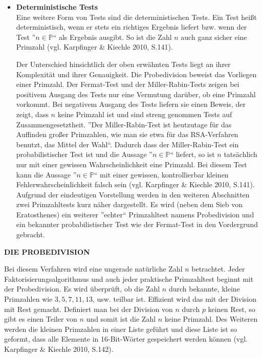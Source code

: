 \begin{itemize}
 \item \textbf{Deterministische Tests}\\
    Eine weitere Form von Tests sind die deterministischen
    Tests. Ein Test heißt deterministisch, wenn er stets ein
    richtiges Ergebnis liefert bzw. wenn der Test
    ''$n \in\mathbb{P}$`` als Ergebnis ausgibt. So ist die
    Zahl $n$ auch ganz sicher eine Primzahl
    (vgl. Karpfinger \& Kiechle 2010, S.141).
    
    Der Unterschied hinsichtlich der oben erwähnten Tests
    liegt an ihrer Komplexität und ihrer Genauigkeit.
    Die Probedivision beweist das Vorliegen einer Primzahl.
    Der Fermat-Test und der Miller-Rabin-Tests zeigen bei
    positivem Ausgang des Tests nur eine Vermutung darüber,
    ob eine Primzahl vorkommt. Bei negativem Ausgang des
    Tests liefern sie einen Beweis, der zeigt, dass $n$
    keine Primzahl ist und sind streng genommen Tests auf
    Zusammengesetztheit. ''Der Miller-Rabin-Test ist
    heutzutage für das Auffinden großer Primzahlen, wie man
    sie etwa für das RSA-Verfahren benutzt, das Mittel der 
    Wahl``. Dadurch dass der Miller-Rabin-Test ein
    probabilistischer Test ist und die Aussage
    ''$n \in\mathbb{P}$`` liefert, so ist $n$ tatsächlich
    nur mit einer gewissen Wahrscheinlichkeit eine Primzahl.
    Bei diesem Test kann die Aussage ''$n \in\mathbb{P}$``
    mit einer gewissen, kontrollierbar kleinen
    Fehlerwahrscheinlichkeit falsch sein
    (vgl. Karpfinger \& Kiechle 2010, S.141).\\
    Aufgrund der eindeutigen Vorstellung werden in den
    weiteren Abschnitten zwei Primzahltests kurz näher
    dargestellt. Es wird (neben dem Sieb von Eratosthenes)
    ein weiterer ''echter`` Primzahltest namens
    Probedivision und ein bekannter probabilistischer Test
    wie der Fermat-Test in den Vordergrund gebracht.\\
\end{itemize}


\textbf{DIE PROBEDIVISION}

Bei diesem Verfahren wird eine ungerade natürliche Zahl
$n$ betrachtet. Jeder Faktorisierungsalgorithmus und auch
jeder praktische Primzahltest beginnt mit der Probedivision.
Es wird überprüft, ob die Zahl $n$ durch bekannte, kleine
Primzahlen wie $3, 5, 7, 11, 13$, usw. teilbar ist.
Effizient wird das mit der Division mit Rest gemacht.
Definiert man bei der Division von $n$ durch $p$ keinen Rest,
so gibt es einen Teiler von $n$ und somit ist die Zahl $n$
keine Primzahl. Des Weiteren werden die kleinen Primzahlen
in einer Liste geführt und diese Liste ist so geformt,
dass alle Elemente in 16-Bit-Wörter gespeichert werden können
(vgl. Karpfinger \& Kiechle 2010, S.142).


